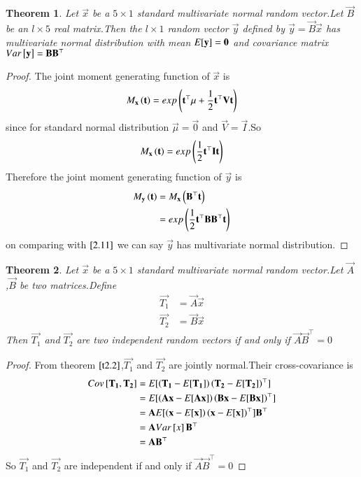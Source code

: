 \documentclass[journal,12pt,twocolumn]{IEEEtran}
\newtheorem{theorem}{Theorem}[section]
\begin{document}
\begin{theorem}
\label{t2.2}
Let $\vec{x}$ be a $5\times 1$ standard multivariate normal random vector.Let $\vec{B}$ be an $l\times 5$ real matrix.Then the $l\times 1$ random vector $\vec{y}$ defined by $\vec{y}=\vec{B}\vec{x}$ has multivariate normal distribution with mean $E[ \mathbf{y} ]=\mathbf{0}$ and covariance matrix $Var{}\left[\mathbf{y}\right]=\mathbf{B}\mathbf{B}^{\top}$ 
\end{theorem}
\begin{proof}
The joint moment generating function of $\vec{x}$ is
\begin{align}
    M_{\mathbf{x}}\left(\mathbf{t}\right)=exp\left(\mathbf{t}^{\top}\mu+\frac{1}{2}\mathbf{t}^{\top}\mathbf{V}\mathbf{t}\right)
\end{align}
since for standard normal distribution $\vec{\mu}=\vec{0}$ and $\vec{V}=\vec{I}$.So
\begin{align}
     M_{\mathbf{x}}\left(\mathbf{t}\right)=exp\left(\frac{1}{2}\mathbf{t}^{\top}\mathbf{I}\mathbf{t}\right)\label{2.11}
\end{align}
Therefore the joint moment generating function of $\vec{y}$ is
\begin{align}
    M_{\mathbf{y}}\left(\mathbf{t}\right)&=M_{\mathbf{x}}\left(\mathbf{B}^{\top}\mathbf{t}\right)\\
    &=exp\left(\frac{1}{2}\mathbf{t}^{\top}\mathbf{B}\mathbf{B}^{\top}\mathbf{t}\right)
\end{align}
on comparing with $\eqref{2.11}$ we can say $\vec{y}$ has multivariate normal distribution. 
\end{proof}
\begin{theorem}
\label{t2.3}
Let $\vec{x}$ be a $5\times 1$ standard multivariate normal random vector.Let $\vec{A}$ ,$\vec{B}$ be two matrices.Define
\begin{align}
    \vec{T_1}&=\vec{A}\vec{x}\\
    \vec{T_2}&=\vec{B}\vec{x}
\end{align}
Then $\vec{T_1}$ and $\vec{T_2}$ are two independent random vectors if and only if $\vec{A}\vec{B}^{\top}=0$
\end{theorem}
\begin{proof}
From theorem $\ref{t2.2}$,$\vec{T_1}$ and $\vec{T_2}$ are jointly normal.Their cross-covariance is
\begin{align}
    Cov{}\left[\mathbf{T_1},\mathbf{T_2}\right]&=E[ \left(\mathbf{T_1}-E[ \mathbf{T_1} ]\right)\left(\mathbf{T_2}-E[ \mathbf{T_2} ]\right)^{\top} ]\\
    &=E[ \left(\mathbf{A}\mathbf{x}-E[ \mathbf{A}\mathbf{x} ]\right)\left(\mathbf{B}\mathbf{x}-E[ \mathbf{B}\mathbf{x} ]\right)^{\top} ]\\
    &=\mathbf{A}E[ \left(\mathbf{x}-E[ \mathbf{x} ]\right)\left(\mathbf{x}-E[ \mathbf{x} ]\right)^{\top} ]\mathbf{B}^{\top}\\
    &=\mathbf{A}Var{}\left[x\right]\mathbf{B}^{\top}\\
    &=\mathbf{A}\mathbf{B}^{\top}
\end{align}
So $\vec{T_1}$ and $\vec{T_2}$ are independent if and only if $\vec{A}\vec{B}^{\top}=0$
\end{proof}
\end{document}
